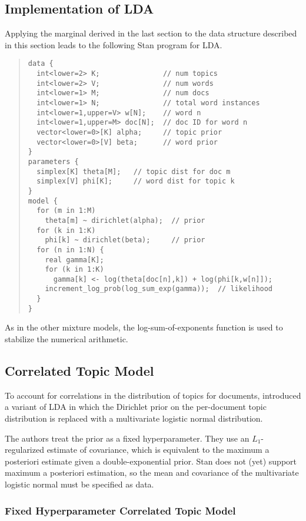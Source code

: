 \subsection{Implementation of LDA}


Applying the marginal derived in the last section to the data
structure described in this section leads to the following Stan
program for LDA.
%
\begin{quote}
\begin{Verbatim}[fontsize=\small]
data {
  int<lower=2> K;               // num topics
  int<lower=2> V;               // num words
  int<lower=1> M;               // num docs
  int<lower=1> N;               // total word instances
  int<lower=1,upper=V> w[N];    // word n
  int<lower=1,upper=M> doc[N];  // doc ID for word n
  vector<lower=0>[K] alpha;     // topic prior
  vector<lower=0>[V] beta;      // word prior
}
parameters {
  simplex[K] theta[M];   // topic dist for doc m
  simplex[V] phi[K];     // word dist for topic k
}
model {
  for (m in 1:M)  
    theta[m] ~ dirichlet(alpha);  // prior
  for (k in 1:K)  
    phi[k] ~ dirichlet(beta);     // prior
  for (n in 1:N) {
    real gamma[K];
    for (k in 1:K) 
      gamma[k] <- log(theta[doc[n],k]) + log(phi[k,w[n]]);
    increment_log_prob(log_sum_exp(gamma));  // likelihood
  }
}
\end{Verbatim}
\end{quote}
%
As in the other mixture models, the log-sum-of-exponents function is
used to stabilize the numerical arithmetic. 

\subsection{Correlated Topic Model}

To account for correlations in the distribution of topics for
documents, \citep{BleiLafferty:2007} introduced a variant of LDA in
which the Dirichlet prior on the per-document topic distribution is
replaced with a multivariate logistic normal distribution.  

The authors treat the prior as a fixed hyperparameter.  They use an
$L_1$-regularized estimate of covariance, which is equivalent to the
maximum a posteriori estimate given a double-exponential prior.  Stan
does not (yet) support maximum a posteriori estimation, so the mean and
covariance of the multivariate logistic normal must be specified as
data.

\subsubsection{Fixed Hyperparameter Correlated Topic Model}

